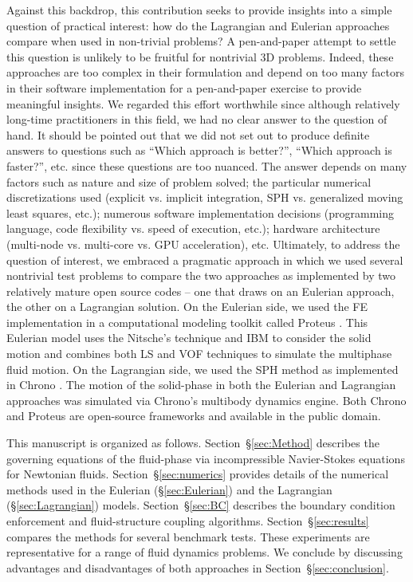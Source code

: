 \documentclass[final,3p,times]{elsarticle}
\begin{document}
Against this backdrop, this contribution seeks to provide insights into a simple question of practical interest: how do the Lagrangian and Eulerian approaches compare when used in non-trivial problems? A pen-and-paper attempt to settle this question is unlikely to be fruitful for nontrivial 3D problems. Indeed, these approaches are too complex in their formulation and depend on too many factors in their software implementation for a pen-and-paper exercise to provide meaningful insights. We regarded this effort worthwhile since although relatively long-time practitioners in this field, we had no clear answer to the question of hand. It should be pointed out that we did not set out to produce definite answers to questions such as ``Which approach is better?'', ``Which approach is faster?'', etc. since these questions are too nuanced. The answer depends on many factors such as nature and size of problem solved; the particular numerical discretizations used (explicit vs. implicit integration, SPH vs. generalized moving least squares, etc.); numerous software implementation decisions (programming language, code flexibility vs. speed of execution, etc.); hardware architecture (multi-node vs. multi-core vs. GPU acceleration), etc. Ultimately, to address the question of interest, we embraced a pragmatic approach in which we used several nontrivial test problems to compare the two approaches as implemented by two relatively mature open source codes -- one that draws on an Eulerian approach, the other on a Lagrangian solution. On the Eulerian side, we used the FE implementation in a computational modeling toolkit called Proteus \cite{proteus_1_6_1}. This Eulerian model uses the Nitsche's technique and IBM to consider the solid motion and combines both LS and VOF techniques to simulate the multiphase fluid motion. On the Lagrangian side, we used the SPH method as implemented in Chrono \cite{projectChronoWebSite,chronoOverview2016}. 
The motion of the solid-phase in both the Eulerian and Lagrangian approaches was simulated via Chrono's multibody dynamics engine. Both Chrono and Proteus are open-source frameworks and available in the public domain.

This manuscript is organized as follows. Section~\S\ref{sec:Method} describes the governing equations of the fluid-phase via incompressible Navier-Stokes equations for Newtonian fluids. Section~\S\ref{sec:numerics} provides details of the numerical methods used in the Eulerian (\S\ref{sec:Eulerian}) and the Lagrangian (\S\ref{sec:Lagrangian}) models. Section~\S\ref{sec:BC} describes the boundary condition enforcement and fluid-structure coupling algorithms. Section~\S\ref{sec:results} compares the methods for several benchmark tests. These experiments are representative for a range of fluid dynamics problems. We conclude by discussing advantages and disadvantages of both approaches in Section~\S\ref{sec:conclusion}. 
\end{document}
